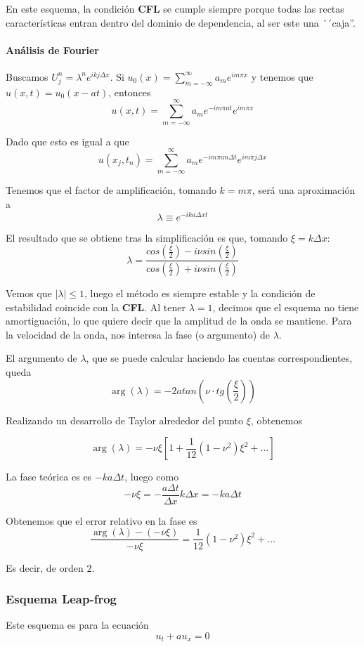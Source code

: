 En este esquema, la condición \textbf{CFL} se cumple siempre porque todas las rectas características entran dentro del dominio de dependencia, al ser este una ´´caja''.

\paragraph{Análisis de Fourier}
Buscamos $U_j^n = \lambda^ne^{ikj\Delta x}$.
Si $u_0(x) = \sum_{m=-\infty}^\infty a_m e^{im\pi x}$ y tenemos que $u(x,t) = u_0(x-at)$, entonces
$$u(x,t) = \sum_{m=-\infty}^\infty a_m e^{-im\pi at}e^{im\pi x}$$

Dado que esto es igual a que
$$u(x_j,t_n) = \sum_{m=-\infty}^\infty a_m e^{-im\pi an\Delta t}e^{im\pi j\Delta x}$$

Tenemos que el factor de amplificación, tomando $k = m\pi$, será una aproximación a 
$$\lambda \equiv e^{-ika\Delta xt}$$

El resultado que se obtiene tras la simplificación es que, tomando $\xi = k\Delta x$:
$$\lambda  = \frac{cos(\frac{\xi}{2})-i\nu sin(\frac{\xi}{2})}{cos(\frac{\xi}{2})+i\nu sin(\frac{\xi}{2})}$$

Vemos que $|\lambda| \le 1$, luego el método es siempre estable y la condición de estabilidad coincide con la \textbf{CFL}. Al tener $\lambda = 1$, decimos que el esquema no tiene amortiguación, lo que quiere decir que la amplitud de la onda se mantiene. Para la velocidad de la onda, nos interesa la fase (o argumento) de $\lambda$.

El argumento de $\lambda$, que se puede calcular haciendo las cuentas correspondientes, queda
$$\arg(\lambda) = -2atan(\nu\cdot tg(\frac{\xi}{2}))$$

Realizando un desarrollo de Taylor alrededor del punto $\xi$, obtenemos

$$\arg(\lambda) = -\nu\xi\left[1+\frac{1}{12}(1-\nu^2)\xi^2+\hdots\right]$$

La fase teórica es es $-ka\Delta t$, luego como
$$-\nu\xi = -\frac{a\Delta t}{\Delta x}k\Delta x = -ka\Delta t$$

Obtenemos que el error relativo en la fase es
$$\frac{\arg(\lambda) - (-\nu \xi)}{-\nu\xi} = \frac{1}{12}(1-\nu^2)\xi^2+\hdots$$

Es decir, de orden $2$.


\subsubsection{Esquema Leap-frog}
Este esquema es para la ecuación 
$$u_t+au_x = 0$$

